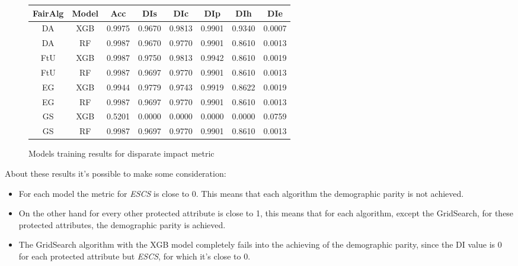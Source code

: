 \begin{figure}[H]
    \centering
    \begin{tabular}{|c|c|c|c|c|c|c|c|}
        \hline
        \textbf{FairAlg} & \textbf{Model} & \textbf{Acc} & \textbf{DIs} & \textbf{DIc} & \textbf{DIp} & \textbf{DIh} & \textbf{DIe} \\
        \hline
        DA & XGB & 0.9975 & 0.9670 & 0.9813 & 0.9901 & 0.9340 & 0.0007 \\
        \hline
        DA & RF & 0.9987 & 0.9670 & 0.9770 & 0.9901 & 0.8610 & 0.0013 \\
        \hline
        FtU & XGB & 0.9987 & 0.9750 & 0.9813 & 0.9942 & 0.8610 & 0.0019 \\
        \hline
        FtU & RF & 0.9987 & 0.9697 & 0.9770 & 0.9901 & 0.8610 & 0.0013 \\
        \hline
        EG & XGB & 0.9944 & 0.9779 & 0.9743 & 0.9919 & 0.8622 & 0.0019 \\
        \hline
        EG & RF & 0.9987 & 0.9697 & 0.9770 & 0.9901 & 0.8610 & 0.0013 \\
        \hline
        GS & XGB & 0.5201 & 0.0000 & 0.0000 & 0.0000 & 0.0000 & 0.0759 \\
        \hline
        GS & RF & 0.9987 & 0.9697 & 0.9770 & 0.9901 & 0.8610 & 0.0013 \\
        \hline
    \end{tabular}
    \caption{Models training results for disparate impact metric}
    \label{fig:results}
\end{figure}

About these results it's possible to make some consideration:

\begin{itemize}

    \item For each model the metric for \emph{ESCS} is close to 0. This means that each algorithm the demographic parity is not achieved.

    \item On the other hand for every other protected attribute is close to 1, this means that for each algorithm, except the GridSearch, for these protected attributes, the demographic parity is achieved.

    \item The GridSearch algorithm with the XGB model completely fails into the achieving of the demographic parity, since the DI value is 0 for each protected attribute but \emph{ESCS}, for which it's close to 0.
    
\end{itemize}

